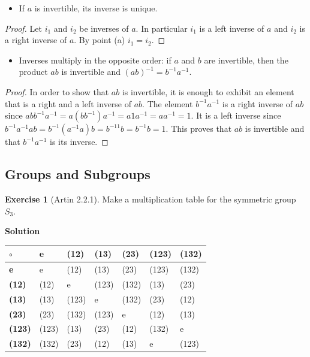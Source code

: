 \documentclass[
]{book}
\providecommand{\tightlist}{%
  \setlength{\itemsep}{0pt}\setlength{\parskip}{0pt}}
\theoremstyle{definition}
\theoremstyle{definition}
\theoremstyle{definition}
\newtheorem{exercise}{Exercise}[chapter]
\theoremstyle{definition}
\theoremstyle{remark}
\begin{document}
\begin{itemize}
\tightlist
\item
  If \(a\) is invertible, its inverse is unique.
\end{itemize}

\begin{proof}
Let \(i_1\) and \(i_2\) be inverses of \(a\). In particular \(i_1\) is a left inverse of \(a\) and \(i_2\) is a right inverse of \(a\). By point (a) \(i_1 = i_2\).
\end{proof}

\begin{itemize}
\tightlist
\item
  Inverses multiply in the opposite order: if \(a\) and \(b\) are invertible, then the product \(ab\) is invertible and \((ab)^{-1} = b^{-1}a^{-1}\).
\end{itemize}

\begin{proof}
In order to show that \(ab\) is invertible, it is enough to exhibit an element that is a right and a left inverse of \(ab\). The element \(b^{-1}a^{-1}\) is a right inverse of \(ab\) since \(abb^{-1}a^{-1} = a(bb^{-1})a^{-1} = a1a^{-1} = aa^{-1} = 1\). It is a left inverse since \(b^{-1}a^{-1}ab = b^{-1}(a^{-1}a)b = b^{-11}b = b^{-1}b = 1\). This proves that \(ab\) is invertible and that \(b^{-1}a^{-1}\) is its inverse.
\end{proof}

\hypertarget{groups-and-subgroups-1}{%
\subsection{Groups and Subgroups}\label{groups-and-subgroups-1}}

\begin{exercise}[Artin 2.2.1]
\protect\hypertarget{exr:unnamed-chunk-89}{}\label{exr:unnamed-chunk-89}Make a multiplication table for the symmetric group \(S_3\).
\end{exercise}

\textbf{Solution}

\begin{longtable}[]{@{}lllllll@{}}
\toprule\noalign{}
\(\circ\) & \textbf{e} & (12) & (13) & (23) & (123) & (132) \\
\midrule\noalign{}
\endhead
\bottomrule\noalign{}
\endlastfoot
\textbf{e} & e & (12) & (13) & (23) & (123) & (132) \\
\textbf{(12)} & (12) & e & (123) & (132) & (13) & (23) \\
\textbf{(13)} & (13) & (123) & e & (132) & (23) & (12) \\
\textbf{(23)} & (23) & (132) & (123) & e & (12) & (13) \\
\textbf{(123)} & (123) & (13) & (23) & (12) & (132) & e \\
\textbf{(132)} & (132) & (23) & (12) & (13) & e & (123) \\
\end{longtable}
\end{document}
